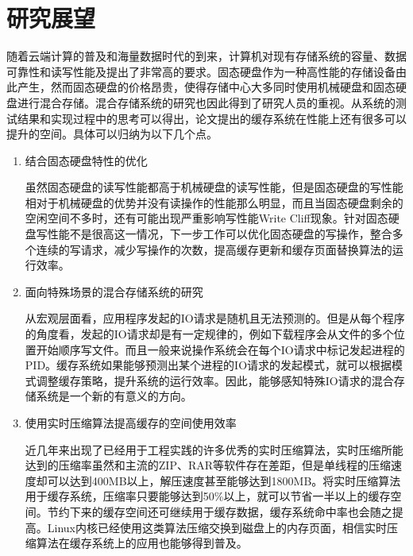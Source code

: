 \section{研究展望}
\label{sec:thesis_expectation}
随着云端计算的普及和海量数据时代的到来，计算机对现有存储系统的容量、数据可靠性和读写性能及提出了非常高的要求。固态硬盘作为一种高性能的存储设备由此产生，然而固态硬盘的价格昂贵，使得存储中心大多同时使用机械硬盘和固态硬盘进行混合存储。混合存储系统的研究也因此得到了研究人员的重视。从系统的测试结果和实现过程中的思考可以得出，论文提出的缓存系统在性能上还有很多可以提升的空间。具体可以归纳为以下几个点。

\begin{enumerate}
\item 结合固态硬盘特性的优化

虽然固态硬盘的读写性能都高于机械硬盘的读写性能，但是固态硬盘的写性能相对于机械硬盘的优势并没有读操作的性能那么明显，而且当固态硬盘剩余的空闲空间不多时，还有可能出现严重影响写性能Write Cliff现象。针对固态硬盘写性能不是很高这一情况，下一步工作可以优化固态硬盘的写操作，整合多个连续的写请求，减少写操作的次数，提高缓存更新和缓存页面替换算法的运行效率。

\item 面向特殊场景的混合存储系统的研究

从宏观层面看，应用程序发起的IO请求是随机且无法预测的。但是从每个程序的角度看，发起的IO请求却是有一定规律的，例如下载程序会从文件的多个位置开始顺序写文件。而且一般来说操作系统会在每个IO请求中标记发起进程的PID。缓存系统如果能够预测出某个进程的IO请求的发起模式，就可以根据模式调整缓存策略，提升系统的运行效率。因此，能够感知特殊IO请求的混合存储系统是一个新的有意义的方向。

\item 使用实时压缩算法提高缓存的空间使用效率

近几年来出现了已经用于工程实践的许多优秀的实时压缩算法，实时压缩所能达到的压缩率虽然和主流的ZIP、RAR等软件存在差距，但是单线程的压缩速度却可以达到400MB以上，解压速度甚至能够达到1800MB。将实时压缩算法用于缓存系统，压缩率只要能够达到50\%以上，就可以节省一半以上的缓存空间。节约下来的缓存空间还可继续用于缓存数据，缓存系统命中率也会随之提高。Linux内核已经使用这类算法压缩交换到磁盘上的内存页面，相信实时压缩算法在缓存系统上的应用也能够得到普及。

\end{enumerate}
